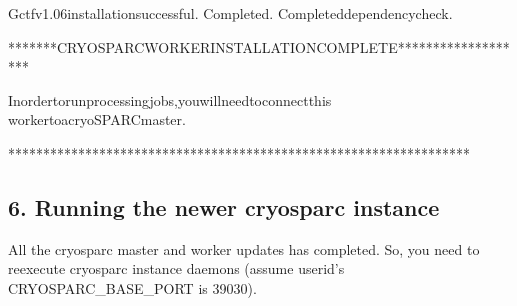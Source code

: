 \documentclass[a4paper,11pt,english]{sphinxmanual}
\begin{document}
\begin{sphinxVerbatim}[commandchars=\\\{\}]
\PYGZhy{}\PYGZhy{}\PYGZhy{}\PYGZhy{}\PYGZhy{}\PYGZhy{}\PYGZhy{}\PYGZhy{}\PYGZhy{}\PYGZhy{}\PYGZhy{}\PYGZhy{}\PYGZhy{}\PYGZhy{}\PYGZhy{}\PYGZhy{}\PYGZhy{}\PYGZhy{}\PYGZhy{}\PYGZhy{}\PYGZhy{}\PYGZhy{}\PYGZhy{}\PYGZhy{}\PYGZhy{}\PYGZhy{}\PYGZhy{}\PYGZhy{}\PYGZhy{}\PYGZhy{}\PYGZhy{}\PYGZhy{}\PYGZhy{}\PYGZhy{}\PYGZhy{}\PYGZhy{}\PYGZhy{}\PYGZhy{}\PYGZhy{}\PYGZhy{}\PYGZhy{}\PYGZhy{}\PYGZhy{}\PYGZhy{}\PYGZhy{}\PYGZhy{}\PYGZhy{}\PYGZhy{}\PYGZhy{}\PYGZhy{}\PYGZhy{}\PYGZhy{}\PYGZhy{}\PYGZhy{}\PYGZhy{}\PYGZhy{}\PYGZhy{}\PYGZhy{}\PYGZhy{}\PYGZhy{}\PYGZhy{}\PYGZhy{}\PYGZhy{}\PYGZhy{}\PYGZhy{}\PYGZhy{}\PYGZhy{}\PYGZhy{}\PYGZhy{}\PYGZhy{}\PYGZhy{}\PYGZhy{}
Gctfv1.06installationsuccessful.
\PYGZhy{}\PYGZhy{}\PYGZhy{}\PYGZhy{}\PYGZhy{}\PYGZhy{}\PYGZhy{}\PYGZhy{}\PYGZhy{}\PYGZhy{}\PYGZhy{}\PYGZhy{}\PYGZhy{}\PYGZhy{}\PYGZhy{}\PYGZhy{}\PYGZhy{}\PYGZhy{}\PYGZhy{}\PYGZhy{}\PYGZhy{}\PYGZhy{}\PYGZhy{}\PYGZhy{}\PYGZhy{}\PYGZhy{}\PYGZhy{}\PYGZhy{}\PYGZhy{}\PYGZhy{}\PYGZhy{}\PYGZhy{}\PYGZhy{}\PYGZhy{}\PYGZhy{}\PYGZhy{}\PYGZhy{}\PYGZhy{}\PYGZhy{}\PYGZhy{}\PYGZhy{}\PYGZhy{}\PYGZhy{}\PYGZhy{}\PYGZhy{}\PYGZhy{}\PYGZhy{}\PYGZhy{}\PYGZhy{}\PYGZhy{}\PYGZhy{}\PYGZhy{}\PYGZhy{}\PYGZhy{}\PYGZhy{}\PYGZhy{}\PYGZhy{}\PYGZhy{}\PYGZhy{}\PYGZhy{}\PYGZhy{}\PYGZhy{}\PYGZhy{}\PYGZhy{}\PYGZhy{}\PYGZhy{}\PYGZhy{}\PYGZhy{}\PYGZhy{}\PYGZhy{}\PYGZhy{}\PYGZhy{}
Completed.
Completeddependencycheck.

*******CRYOSPARCWORKERINSTALLATIONCOMPLETE*******************

Inordertorunprocessingjobs,youwillneedtoconnectthis
workertoacryoSPARCmaster.

******************************************************************
\end{sphinxVerbatim}


\subsection{6. Running the newer cryosparc instance}
\label{\detokenize{faq:running-the-newer-cryosparc-instance}}
\sphinxAtStartPar
All the cryosparc master and worker updates has completed. So, you need to re\sphinxhyphen{}execute cryosparc instance daemons (assume userid’s CRYOSPARC\_BASE\_PORT is 39030).
\end{document}
